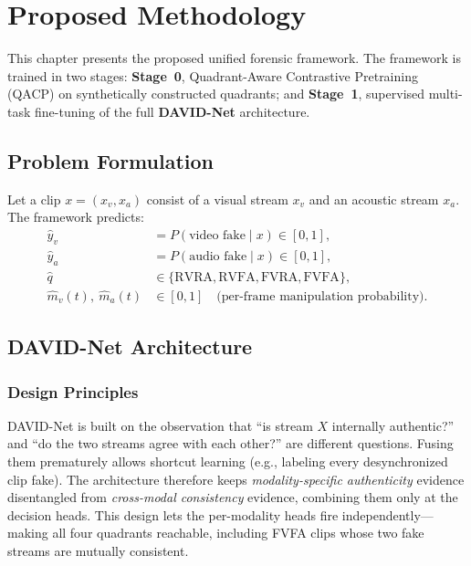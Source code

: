 \chapter{Proposed Methodology}
\label{ch:methodology}

This chapter presents the proposed unified forensic framework. The framework is
trained in two stages: \textbf{Stage~0}, Quadrant-Aware Contrastive Pretraining
(QACP) on synthetically constructed quadrants; and \textbf{Stage~1}, supervised
multi-task fine-tuning of the full \textbf{DAVID-Net} architecture.

\section{Problem Formulation}
Let a clip $x = (x_v, x_a)$ consist of a visual stream $x_v$ and an acoustic
stream $x_a$. The framework predicts:
\begin{align}
  \hat{y}_v &= P(\text{video fake} \mid x) \in [0,1], \\
  \hat{y}_a &= P(\text{audio fake} \mid x) \in [0,1], \\
  \hat{q}   &\in \{\text{RVRA}, \text{RVFA}, \text{FVRA}, \text{FVFA}\}, \\
  \hat{m}_v(t),\ \hat{m}_a(t) &\in [0,1] \quad \text{(per-frame manipulation probability)}.
\end{align}

\section{DAVID-Net Architecture}
\label{sec:davidnet}


\subsection{Design Principles}
DAVID-Net is built on the observation that ``is stream $X$ internally
authentic?'' and ``do the two streams agree with each other?'' are different
questions. Fusing them prematurely allows shortcut learning (e.g., labeling every
desynchronized clip fake). The architecture therefore keeps
\emph{modality-specific authenticity} evidence disentangled from
\emph{cross-modal consistency} evidence, combining them only at the decision
heads. This design lets the per-modality heads fire independently---making all
four quadrants reachable, including FVFA clips whose two fake streams are
mutually consistent.

